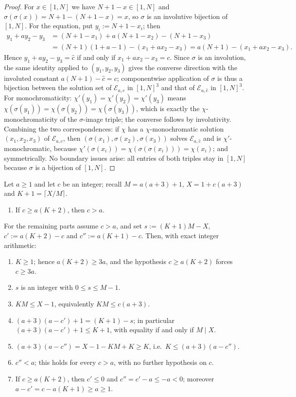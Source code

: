\begin{proof}
For $x \in [1,N]$ we have $N + 1 - x \in [1,N]$ and
$\sigma(\sigma(x)) = N + 1 - (N + 1 - x) = x$, so $\sigma$ is an involutive
bijection of $[1,N]$. For the equation, put $y_i := N + 1 - x_i$; then
\begin{align*}
y_1 + a y_2 - y_3
&= (N+1-x_1) + a(N+1-x_2) - (N+1-x_3) \\
&= (N+1)(1 + a - 1) - (x_1 + a x_2 - x_3)
 = a(N+1) - (x_1 + a x_2 - x_3) .
\end{align*}
Hence $y_1 + a y_2 - y_3 = \hat c$ if and only if
$x_1 + a x_2 - x_3 = c$. Since $\sigma$ is an involution, the same identity
applied to $(y_1,y_2,y_3)$ gives the converse direction with the involuted
constant $a(N+1) - \hat c = c$; componentwise application of $\sigma$ is
thus a bijection between the solution set of $\mathcal{E}_{a,c}$ in
$[1,N]^3$ and that of $\mathcal{E}_{a,\hat c}$ in $[1,N]^3$. For
monochromaticity: $\chi'(y_1) = \chi'(y_2) = \chi'(y_3)$ means
$\chi(\sigma(y_1)) = \chi(\sigma(y_2)) = \chi(\sigma(y_3))$, which is
exactly the $\chi$-monochromaticity of the $\sigma$-image triple; the
converse follows by involutivity. Combining the two correspondences: if
$\chi$ has a $\chi$-monochromatic solution $(x_1,x_2,x_3)$ of
$\mathcal{E}_{a,c}$, then $(\sigma(x_1),\sigma(x_2),\sigma(x_3))$ solves
$\mathcal{E}_{a,\hat c}$ and is $\chi'$-monochromatic, because
$\chi'(\sigma(x_i)) = \chi(\sigma(\sigma(x_i))) = \chi(x_i)$; and
symmetrically. No boundary issues arise: all entries of both triples stay
in $[1,N]$ because $\sigma$ is a bijection of $[1,N]$.
\end{proof}

\begin{lemma}\label{lem:conj-arith}
Let $a \ge 1$ and let $c$ be an integer; recall $M = a(a+3)+1$,
$X = 1 + c(a+3)$ and $K + 1 = \lceil X/M \rceil$.
\begin{enumerate}
\item[(i)] If $c \ge a(K+2)$, then $c > a$.
\end{enumerate}
For the remaining parts assume $c > a$, and set $s := (K+1)M - X$,
$c' := a(K+2) - c$ and $c'' := a(K+1) - c$. Then, with exact integer
arithmetic:
\begin{enumerate}
\item[(ii)] $K \ge 1$; hence $a(K+2) \ge 3a$, and the hypothesis
$c \ge a(K+2)$ forces $c \ge 3a$.
\item[(iii)] $s$ is an integer with $0 \le s \le M - 1$.
\item[(iv)] $KM \le X - 1$, equivalently $KM \le c(a+3)$.
\item[(v)] $(a+3)(a - c') + 1 = (K+1) - s$; in particular
$(a+3)(a - c') + 1 \le K + 1$, with equality if and only if $M \mid X$.
\item[(vi)] $(a+3)(a - c'') = X - 1 - KM + K \ge K$, i.e.\
$K \le (a+3)(a - c'')$.
\item[(vii)] $c'' < a$; this holds for every $c > a$, with no further
hypothesis on $c$.
\item[(viii)] If $c \ge a(K+2)$, then $c' \le 0$ and
$c'' = c' - a \le -a < 0$; moreover $a - c' = c - a(K+1) \ge a \ge 1$.
\end{enumerate}
\end{lemma}

